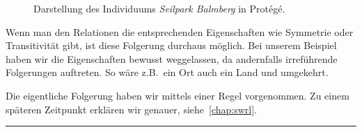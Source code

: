 \begin{figure}[H]
\centering {}
\caption{Darstellung des Individuums \textit{Seilpark Balmberg} in Protégé.\label{fig:inferenz_protege}\protect\footnotemark}
\end{figure}

Wenn man den Relationen die entsprechenden Eigenschaften wie Symmetrie oder Transitivität gibt, ist diese Folgerung durchaus möglich. Bei unserem Beispiel haben wir die Eigenschaften bewusst weggelassen, da andernfalls irreführende Folgerungen auftreten. So wäre z.B.\ ein Ort auch ein Land und umgekehrt.

Die eigentliche Folgerung haben wir mittels einer Regel vorgenommen. Zu einem späteren Zeitpunkt erklären wir genauer, siehe~\autoref{chap:swrl}.

\noindent\rule[1ex]{\textwidth}{1pt}
